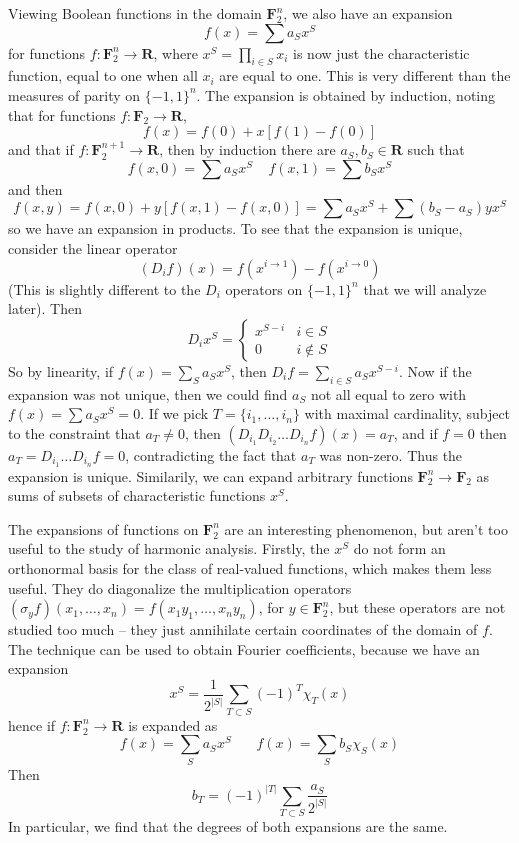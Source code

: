 Viewing Boolean functions in the domain $\mathbf{F}_2^n$, we also have an expansion
%
\[ f(x) = \sum a_S x^S \]
%
for functions $f: \mathbf{F}_2^n \to \mathbf{R}$, where $x^S = \prod_{i \in S} x_i$ is now just the characteristic function, equal to one when all $x_i$ are equal to one. This is very different than the measures of parity on $\{ -1, 1 \}^n$. The expansion is obtained by induction, noting that for functions $f: \mathbf{F}_2 \to \mathbf{R}$,
%
\[ f(x) = f(0) + x[f(1) - f(0)] \]
%
and that if $f: \mathbf{F}_2^{n+1} \to \mathbf{R}$, then by induction there are $a_S, b_S \in \mathbf{R}$ such that
%
\[ f(x,0) = \sum a_S x^S\ \ \ \ \ f(x,1) = \sum b_S x^S \]
%
and then
%
\[ f(x,y) = f(x,0) + y[f(x,1) - f(x,0)] = \sum a_S x^S + \sum (b_S - a_S) yx^S \]
%
so we have an expansion in products. To see that the expansion is unique, consider the linear operator
%
\[ (D_i f)(x) = f(x^{i \to 1}) - f(x^{i \to 0}) \]
%
(This is slightly different to the $D_i$ operators on $\{ -1, 1 \}^n$ that we will analyze later). Then
%
\[ D_i x^S = \begin{cases} x^{S - i} & i \in S \\ 0 & i \not \in S \end{cases} \]
%
So by linearity, if $f(x) = \sum_S a_S x^S$, then $D_i f = \sum_{i \in S} a_S x^{S-i}$. Now if the expansion was not unique, then we could find $a_S$ not all equal to zero with $f(x) = \sum a_S x^S = 0$. If we pick $T = \{ i_1, \dots, i_n \}$ with maximal cardinality, subject to the constraint that $a_T \neq 0$, then $(D_{i_1} D_{i_2} \dots D_{i_n} f)(x) = a_T$, and if $f = 0$ then $a_T = D_{i_1} \dots D_{i_n} f = 0$, contradicting the fact that $a_T$ was non-zero. Thus the expansion is unique. Similarily, we can expand arbitrary functions $\mathbf{F}_2^n \to \mathbf{F}_2$ as sums of subsets of characteristic functions $x^S$.

The expansions of functions on $\mathbf{F}_2^n$ are an interesting phenomenon, but aren't too useful to the study of harmonic analysis. Firstly, the $x^S$ do not form an orthonormal basis for the class of real-valued functions, which makes them less useful. They do diagonalize the multiplication operators $(\sigma_y f)(x_1, \dots, x_n) = f(x_1y_1, \dots, x_ny_n)$, for $y \in \mathbf{F}^n_2$, but these operators are not studied too much -- they just annihilate certain coordinates of the domain of $f$. The technique can be used to obtain Fourier coefficients, because we have an expansion
%
\[ x^S = \frac{1}{2^{|S|}} \sum_{T \subset S} (-1)^{T} \chi_T(x) \]
%
hence if $f: \mathbf{F}_2^n \to \mathbf{R}$ is expanded as
%
\[ f(x) = \sum_S a_S x^S\ \ \ \ \ \ \ \ f(x) = \sum_S b_S \chi_S(x) \]
%
Then
%
\[ b_T = (-1)^{|T|} \sum_{T \subset S} \frac{a_S}{2^{|S|}}  \]
%
In particular, we find that the degrees of both expansions are the same.

